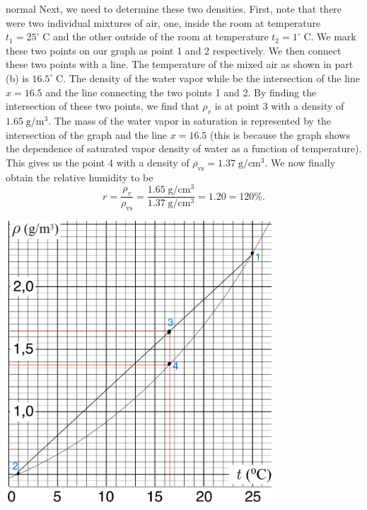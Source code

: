 \begin{solution}{normal}
\noindent Next, we need to determine these two densities. First, note that there were two individual mixtures of air, one, inside the room at temperature $t_1 = 25^{\circ}\;\mathrm{C}$ and the other outside of the room at temperature $t_2 = 1^{\circ}\;\mathrm{C}$. We mark these two points on our graph as point 1 and 2 respectively. We then connect these two points with a line. The temperature of the mixed air as shown in part (b) is $16.5^{\circ}\;\mathrm{C}$. The density of the water vapor while be the intersection of the line $x = 16.5$ and the line connecting the two points 1 and 2. By finding the intersection of these two points, we find that $\rho_v$ is at point 3 with a density of $1.65\;\mathrm{g/m^3}$. The mass of the water vapor in saturation is represented by the intersection of the graph and the line $x = 16.5$ (this is because the graph shows the dependence of saturated vapor density of water as a function of temperature). This gives us the point 4 with a density of $\rho_{\text{vs}} = 1.37\;\mathrm{g/cm^3}$. We now finally obtain the relative humidity to be
\[r = \frac{\rho_v}{\rho_{\text{vs}}} = \frac{1.65\;\mathrm{g/cm^3}}{1.37\;\mathrm{g/cm^3}} = 1.20 = 120\%.\]
\begin{center}
    \includegraphics[width=10cm]{B89B8B17-45E5-4913-9313-C1B06F8B168D.jpeg}
\end{center}
\vspace{3mm}


\end{solution}
